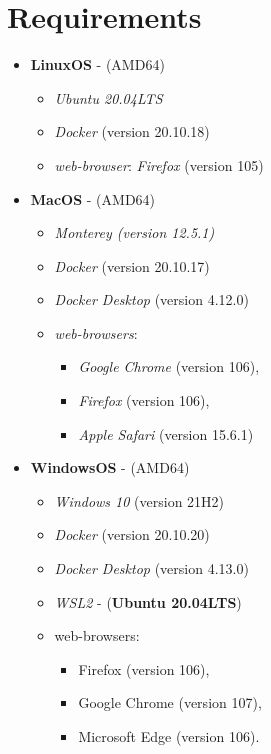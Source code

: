 \documentclass[
  a4paper,
  DIV=11,
  numbers=noendperiod,
  oneside,
  open=any]{scrreport}
\providecommand{\tightlist}{%
  \setlength{\itemsep}{0pt}\setlength{\parskip}{0pt}}\usepackage{longtable,booktabs,array}
\begin{document}
\section*{Requirements}\label{requirements}


\begin{itemize}
\tightlist
\item
  \textbf{LinuxOS} - (AMD64)

  \begin{itemize}
  \tightlist
  \item
    \emph{Ubuntu 20.04LTS}
  \item
    \emph{Docker} (version 20.10.18)
  \item
    \emph{web-browser}: \emph{Firefox} (version 105)
  \end{itemize}
\item
  \textbf{MacOS} - (AMD64)

  \begin{itemize}
  \tightlist
  \item
    \emph{Monterey (version 12.5.1)}
  \item
    \emph{Docker} (version 20.10.17)
  \item
    \emph{Docker Desktop} (version 4.12.0)
  \item
    \emph{web-browsers}:

    \begin{itemize}
    \tightlist
    \item
      \emph{Google Chrome} (version 106),
    \item
      \emph{Firefox} (version 106),
    \item
      \emph{Apple Safari} (version 15.6.1)
    \end{itemize}
  \end{itemize}
\item
  \textbf{WindowsOS} - (AMD64)

  \begin{itemize}
  \tightlist
  \item
    \emph{Windows 10} (version 21H2)
  \item
    \emph{Docker} (version 20.10.20)
  \item
    \emph{Docker Desktop} (version 4.13.0)
  \item
    \emph{WSL2} - (\textbf{Ubuntu 20.04LTS})
  \item
    web-browsers:

    \begin{itemize}
    \tightlist
    \item
      Firefox (version 106),
    \item
      Google Chrome (version 107),
    \item
      Microsoft Edge (version 106).
    \end{itemize}
  \end{itemize}
\end{itemize}
\end{document}
